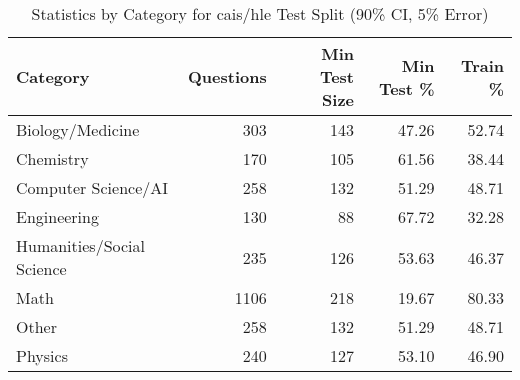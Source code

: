 \vspace*{-\baselineskip}
\vspace*{-\baselineskip}
\begin{table}[H]
\centering
\begin{tabular}{lrrrr}
\toprule
Category & Questions & Min Test Size & Min Test \% & Train \% \\
\midrule
Biology/Medicine & 303 & 143 & 47.26 & 52.74 \\
Chemistry & 170 & 105 & 61.56 & 38.44 \\
Computer Science/AI & 258 & 132 & 51.29 & 48.71 \\
Engineering & 130 & 88 & 67.72 & 32.28 \\
Humanities/Social Science & 235 & 126 & 53.63 & 46.37 \\
Math & 1106 & 218 & 19.67 & 80.33 \\
Other & 258 & 132 & 51.29 & 48.71 \\
Physics & 240 & 127 & 53.10 & 46.90 \\
\bottomrule
\end{tabular}
\vspace{0.2cm}
\caption{Statistics by Category for cais/hle Test Split (90\% CI, 5\% Error)}
\label{tab:split_analysis}
\end{table}
\vspace*{-\baselineskip}